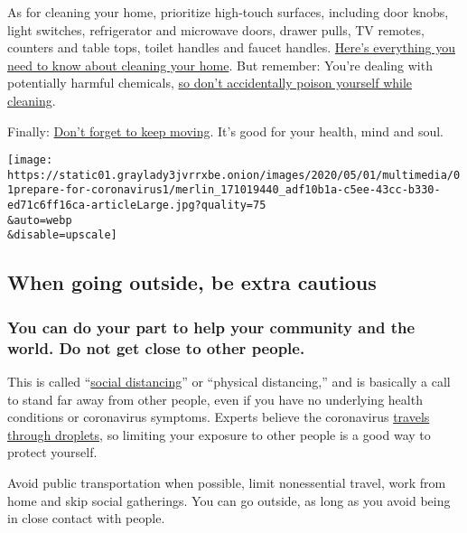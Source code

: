 As for cleaning your home, prioritize high-touch surfaces, including
door knobs, light switches, refrigerator and microwave doors, drawer
pulls, TV remotes, counters and table tops, toilet handles and faucet
handles.
\href{https://www.nytimes3xbfgragh.onion/2020/03/18/world/clean-home-coronavirus.html}{Here's
everything you need to know about cleaning your home}. But remember:
You're dealing with potentially harmful chemicals,
\href{https://www.nytimes3xbfgragh.onion/2020/04/02/smarter-living/coronavirus-clean-home-house-disinfect.html}{so
don't accidentally poison yourself while cleaning}.

Finally:
\href{https://www.nytimes3xbfgragh.onion/2020/04/01/well/move/steps-walking-longevity-health.html}{Don't
forget to keep moving}. It's good for your health, mind and soul.

\texttt{[image: https://static01.graylady3jvrrxbe.onion/images/2020/05/01/multimedia/01prepare-for-coronavirus1/merlin\_171019440\_adf10b1a-c5ee-43cc-b330-ed71c6ff16ca-articleLarge.jpg?quality=75\\\&auto=webp\\\&disable=upscale]}

\hypertarget{when-going-outside-be-extra-cautious}{%
\subsection{When going outside, be extra
cautious}\label{when-going-outside-be-extra-cautious}}

\hypertarget{you-can-do-your-part-to-help-your-community-and-the-world-do-not-get-close-to-other-people}{%
\subsubsection{You can do your part to help your community and the
world. Do not get close to other
people.}\label{you-can-do-your-part-to-help-your-community-and-the-world-do-not-get-close-to-other-people}}

This is called
``\href{https://www.nytimes3xbfgragh.onion/2020/03/16/smarter-living/coronavirus-social-distancing.html}{social
distancing}'' or ``physical distancing,'' and is basically a call to
stand far away from other people, even if you have no underlying health
conditions or coronavirus symptoms. Experts believe the coronavirus
\href{https://www.nytimes3xbfgragh.onion/2020/03/02/health/coronavirus-how-it-spreads.html}{travels
through droplets}, so limiting your exposure to other people is a good
way to protect yourself.

Avoid public transportation when possible, limit nonessential travel,
work from home and skip social gatherings. You can go outside, as long
as you avoid being in close contact with people.

